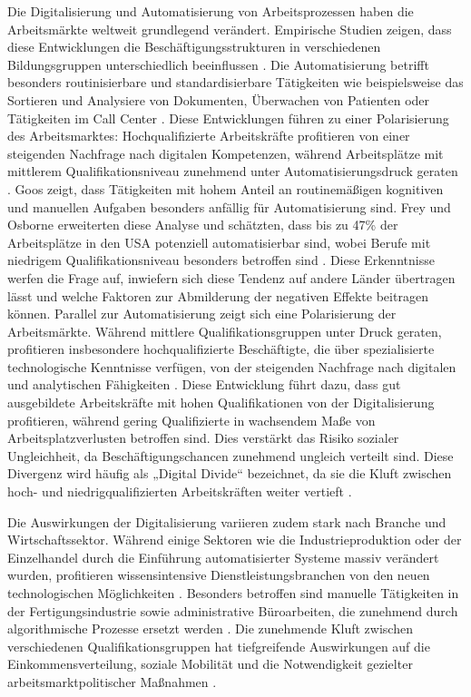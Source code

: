 Die Digitalisierung und Automatisierung von Arbeitsprozessen haben die Arbeitsmärkte weltweit 
grundlegend verändert. Empirische Studien zeigen, dass diese Entwicklungen die 
Beschäftigungsstrukturen in verschiedenen Bildungsgruppen unterschiedlich beeinflussen 
\parencite[vgl.][S. 1588-1590]{autor2013thegrowth}. Die Automatisierung betrifft besonders 
routinisierbare und standardisierbare Tätigkeiten wie beispielsweise das Sortieren und Analysiere 
von Dokumenten, Überwachen von Patienten oder Tätigkeiten im Call Center 
\parencite[vgl.][S. 19-20]{frey2013thefuture}. Diese Entwicklungen führen zu einer Polarisierung 
des Arbeitsmarktes: Hochqualifizierte Arbeitskräfte profitieren von einer steigenden Nachfrage 
nach digitalen Kompetenzen, während Arbeitsplätze mit mittlerem Qualifikationsniveau zunehmend 
unter Automatisierungsdruck geraten \parencite[vgl.][S. 2509–2510]{goos2014explaining}. Goos 
zeigt, dass Tätigkeiten mit hohem Anteil an routinemäßigen kognitiven und manuellen Aufgaben 
besonders anfällig für Automatisierung sind. Frey und Osborne erweiterten diese Analyse und 
schätzten, dass bis zu 47\% der Arbeitsplätze in den USA potenziell automatisierbar sind, wobei 
Berufe mit niedrigem Qualifikationsniveau besonders betroffen sind 
\parencite[S. 39-41]{frey2013thefuture}. Diese Erkenntnisse  werfen die Frage auf, inwiefern sich 
diese Tendenz auf andere Länder übertragen lässt und welche Faktoren zur Abmilderung der 
negativen Effekte beitragen können. 
Parallel zur Automatisierung zeigt sich eine Polarisierung der Arbeitsmärkte. Während 
mittlere Qualifikationsgruppen unter Druck geraten, profitieren insbesondere 
hochqualifizierte Beschäftigte, die über spezialisierte technologische Kenntnisse 
verfügen, von der steigenden Nachfrage nach digitalen und analytischen Fähigkeiten 
\parencite[vgl.][S. 2509]{goos2014explaining}. Diese Entwicklung führt dazu, dass gut 
ausgebildete Arbeitskräfte mit hohen Qualifikationen von der Digitalisierung profitieren, 
während gering Qualifizierte in wachsendem Maße von Arbeitsplatzverlusten betroffen sind. 
Dies verstärkt das Risiko sozialer Ungleichheit, da Beschäftigungschancen zunehmend 
ungleich verteilt sind. Diese Divergenz wird häufig als „Digital Divide“ bezeichnet, da 
sie die Kluft zwischen hoch- und niedrigqualifizierten Arbeitskräften weiter vertieft 
\parencite[vgl.][S. 3]{oecd2019measuring}.

Die Auswirkungen der Digitalisierung variieren zudem stark nach Branche und
Wirtschaftssektor. Während einige Sektoren wie die Industrieproduktion oder der
Einzelhandel durch die Einführung automatisierter Systeme massiv verändert wurden,
profitieren wissensintensive Dienstleistungsbranchen von den neuen technologischen 
Möglichkeiten \parencite[vgl.][S. 1555]{autor2013thegrowth}. Besonders betroffen sind 
manuelle Tätigkeiten in der Fertigungsindustrie sowie administrative Büroarbeiten, die 
zunehmend durch algorithmische Prozesse ersetzt werden 
\parencite[vgl.][S. 36–38]{frey2013thefuture}. Die zunehmende Kluft zwischen verschiedenen 
Qualifikationsgruppen hat tiefgreifende Auswirkungen auf die Einkommensverteilung, soziale 
Mobilität und die Notwendigkeit gezielter arbeitsmarktpolitischer Maßnahmen 
\parencite[S. 1589–1591]{autor2013thegrowth}.

